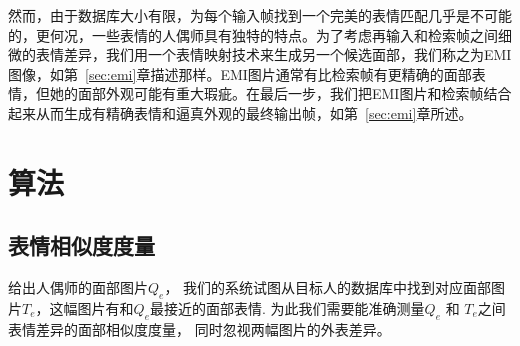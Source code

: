然而，由于数据库大小有限，为每个输入帧找到一个完美的表情匹配几乎是不可能的，更何况，一些表情的人偶师具有独特的特点。为了考虑再输入和检索帧之间细微的表情差异，我们用一个表情映射技术来生成另一个候选面部，我们称之为EMI图像，如第~\ref{sec:emi}章描述那样。EMI图片通常有比检索帧有更精确的面部表情，但她的面部外观可能有重大瑕疵。在最后一步，我们把EMI图片和检索帧结合起来从而生成有精确表情和逼真外观的最终输出帧，如第~\ref{sec:emi}章所述。
\section{算法}
\subsection{表情相似度度量}\label{sec:metric}
给出人偶师的面部图片$Q_e$， 我们的系统试图从目标人的数据库中找到对应面部图片$T_e$，这幅图片有和$Q_e$最接近的面部表情. 为此我们需要能准确测量$Q_e$ 和 $T_e$之间表情差异的面部相似度度量， 同时忽视两幅图片的外表差异。

